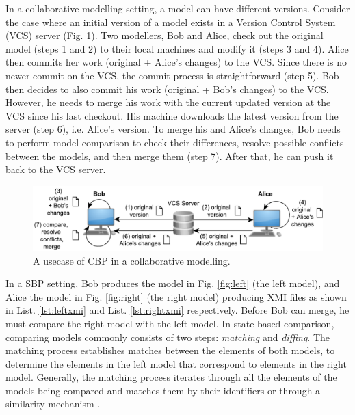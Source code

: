 \vspace{-5pt}
In a collaborative modelling setting, a model can have different versions.
Consider the case where an initial version of a model exists in a Version Control System (VCS) server (Fig. \ref{fig:vcs}).
Two modellers, Bob and Alice, check out the original model (steps 1 and 2) to their local machines and modify it (steps 3 and 4).
Alice then commits her work (original + Alice's changes) to the VCS.
Since there is no newer commit on the VCS, the commit process is straightforward (step 5).
Bob then decides to also commit his work (original + Bob's changes) to the VCS.
However, he needs to merge his work with the current updated version at the VCS since his last checkout.
His machine downloads the latest version from the server (step 6), i.e. Alice's version.
To merge his and Alice's changes, Bob needs to perform model comparison to check their differences, resolve possible conflicts between the models, and then merge them (step 7).
After that, he can push it back to the VCS server.

\begin{figure}[ht]
    \includegraphics[width=\linewidth]{VCS}
    \caption{A usecase of CBP in a collaborative modelling.}
    \label{fig:vcs}
\end{figure}


In a SBP setting, Bob produces the model in Fig. \ref{fig:left} (the left model), and Alice the model in Fig. \ref{fig:right} (the right model) producing XMI files as shown in List. \ref{lst:leftxmi} and List. \ref{lst:rightxmi} respectively.
Before Bob can merge, he must compare the right model with the left model.
In state-based comparison, comparing models commonly consists of two steps: \emph{matching} and \emph{diffing}.
The matching process establishes matches between the elements of both models, to determine the elements in the left model that correspond to elements in the right model.
Generally, the matching process iterates through all the elements of the models being compared and matches them by their identifiers or through a similarity mechanism  \cite{DBLP:conf/sfm/BroschKLSWW12,emfcompare2018developer}.

